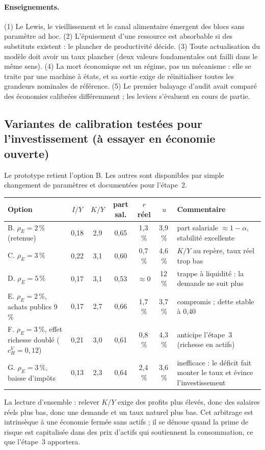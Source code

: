\documentclass[11pt,a4paper]{article}
\begin{document}
\paragraph{Enseignements.} (1) Le Lewis, le vieillissement et le canal alimentaire émergent des blocs sans paramètre ad hoc. (2) L'épuisement d'une ressource est absorbable si des substituts existent : le plancher de productivité décide. (3) Toute actualisation du modèle doit avoir un taux plancher (deux valeurs fondamentales ont failli dans le même sens). (4) La mort économique est un régime, pas un mécanisme : elle se traite par une machine à états, et sa sortie exige de réinitialiser toutes les grandeurs nominales de référence. (5) Le premier balayage d'audit avait comparé des économies calibrées différemment ; les leviers s'évaluent en cours de partie.

\subsection{Variantes de calibration testées pour l'investissement (à essayer en économie ouverte)}
Le prototype retient l'option B. Les autres sont disponibles par simple changement de paramètres et documentées pour l'étape~2.
\begin{center}\small
\begin{tabular}{p{5.2cm}cccccp{4.2cm}}
\toprule
\textbf{Option} & $I/Y$ & $K/Y$ & part sal. & $r$ réel & $u$ & \textbf{Commentaire}\\
\midrule
B. $\rho_E=2\,\%$ (retenue) & 0,18 & 2,9 & 0,65 & 1,3\,\% & 3,9\,\% & part salariale $\approx1-\alpha$, stabilité excellente\\
C. $\rho_E=3\,\%$ & 0,22 & 3,1 & 0,60 & 0,7\,\% & 4,6\,\% & $K/Y$ au repère, taux réel trop bas\\
D. $\rho_E=5\,\%$ & 0,17 & 3,1 & 0,53 & $\approx0$ & 12\,\% & trappe à liquidité : la demande ne suit plus\\
E. $\rho_E=2\,\%$, achats publics 9\,\% & 0,17 & 2,7 & 0,66 & 1,7\,\% & 3,7\,\% & compromis ; dette stable à 0,40\\
F. $\rho_E=3\,\%$, effet richesse doublé ($c^V_H=0{,}12$) & 0,21 & 3,0 & 0,61 & 0,8\,\% & 4,3\,\% & anticipe l'étape~3 (richesse en actifs)\\
G. $\rho_E=3\,\%$, baisse d'impôts & 0,13 & 2,3 & 0,64 & 2,4\,\% & 3,6\,\% & inefficace : le déficit fait monter le taux et évince l'investissement\\
\bottomrule
\end{tabular}
\end{center}
La lecture d'ensemble : relever $K/Y$ exige des profits plus élevés, donc des salaires réels plus bas, donc une demande et un taux naturel plus bas. Cet arbitrage est intrinsèque à une économie fermée sans actifs ; il se dénoue quand la prime de risque est capitalisée dans des prix d'actifs qui soutiennent la consommation, ce que l'étape~3 apportera.
\end{document}

